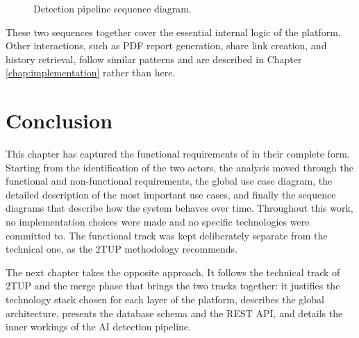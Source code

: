 \begin{figure}[H]
\centering
{}
\caption{Detection pipeline sequence diagram.}
\label{fig:seq-detect}
\end{figure}

These two sequences together cover the essential internal logic of the platform. Other interactions, such as PDF report generation, share link creation, and history retrieval, follow similar patterns and are described in Chapter \ref{chap:implementation} rather than here.

\section{Conclusion}

This chapter has captured the functional requirements of \deepguard{} in their complete form. Starting from the identification of the two actors, the analysis moved through the functional and non-functional requirements, the global use case diagram, the detailed description of the most important use cases, and finally the sequence diagrams that describe how the system behaves over time. Throughout this work, no implementation choices were made and no specific technologies were committed to. The functional track was kept deliberately separate from the technical one, as the 2TUP methodology recommends.

The next chapter takes the opposite approach. It follows the technical track of 2TUP and the merge phase that brings the two tracks together: it justifies the technology stack chosen for each layer of the platform, describes the global architecture, presents the database schema and the REST API, and details the inner workings of the AI detection pipeline.